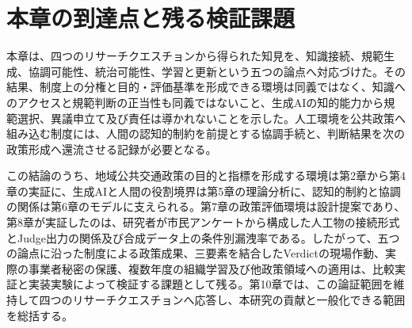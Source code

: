 \section{本章の到達点と残る検証課題}
\label{sec:ch9_scope}

本章は、四つのリサーチクエスチョンから得られた知見を、知識接続、規範生成、協調可能性、統治可能性、学習と更新という五つの論点へ対応づけた。その結果、制度上の分権と目的・評価基準を形成できる環境は同義ではなく、知識へのアクセスと規範判断の正当性も同義ではないこと、生成AIの知的能力から規範選択、異議申立て及び責任は導かれないことを示した。人工環境を公共政策へ組み込む制度には、人間の認知的制約を前提とする協調手続と、判断結果を次の政策形成へ還流させる記録が必要となる。

この結論のうち、地域公共交通政策の目的と指標を形成する環境は第2章から第4章の実証に、生成AIと人間の役割境界は第5章の理論分析に、認知的制約と協調の関係は第6章のモデルに支えられる。第7章の政策評価環境は設計提案であり、第8章が実証したのは、研究者が市民アンケートから構成した人工物の接続形式とJudge出力の関係及び合成データ上の条件別漏洩率である。したがって、五つの論点に沿った制度による政策成果、三要素を結合したVerdictの現場作動、実際の事業者秘密の保護、複数年度の組織学習及び他政策領域への適用は、比較実証と実装実験によって検証する課題として残る。第10章では、この論証範囲を維持して四つのリサーチクエスチョンへ応答し、本研究の貢献と一般化できる範囲を総括する。

\printbibliography[heading=subbibliography,title={章末参考文献}]
